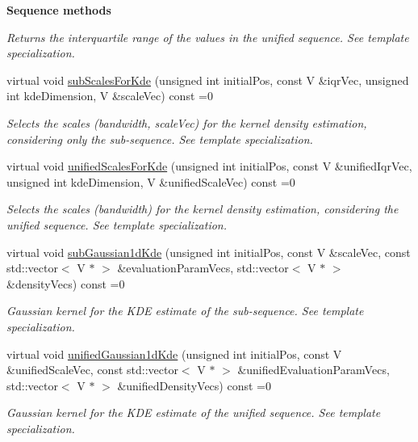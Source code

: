 \begin{Indent}{\bf Sequence methods}
\begin{DoxyCompactItemize}
\begin{DoxyCompactList}\small\item\em Returns the interquartile range of the values in the unified sequence. See template specialization. \end{DoxyCompactList}\item 
virtual void \hyperlink{class_q_u_e_s_o_1_1_base_vector_sequence_af3210c9073cedfcd8dfe79ed323975a2}{sub\-Scales\-For\-Kde} (unsigned int initial\-Pos, const V \&iqr\-Vec, unsigned int kde\-Dimension, V \&scale\-Vec) const =0
\begin{DoxyCompactList}\small\item\em Selects the scales (bandwidth, {\ttfamily scale\-Vec}) for the kernel density estimation, considering only the sub-\/sequence. See template specialization. \end{DoxyCompactList}\item 
virtual void \hyperlink{class_q_u_e_s_o_1_1_base_vector_sequence_a68eae0b37fc934391ce7af2c370fd585}{unified\-Scales\-For\-Kde} (unsigned int initial\-Pos, const V \&unified\-Iqr\-Vec, unsigned int kde\-Dimension, V \&unified\-Scale\-Vec) const =0
\begin{DoxyCompactList}\small\item\em Selects the scales (bandwidth) for the kernel density estimation, considering the unified sequence. See template specialization. \end{DoxyCompactList}\item 
virtual void \hyperlink{class_q_u_e_s_o_1_1_base_vector_sequence_a0fec2746f326acad09b406ad8efe1cfc}{sub\-Gaussian1d\-Kde} (unsigned int initial\-Pos, const V \&scale\-Vec, const std\-::vector$<$ V $\ast$ $>$ \&evaluation\-Param\-Vecs, std\-::vector$<$ V $\ast$ $>$ \&density\-Vecs) const =0
\begin{DoxyCompactList}\small\item\em Gaussian kernel for the K\-D\-E estimate of the sub-\/sequence. See template specialization. \end{DoxyCompactList}\item 
virtual void \hyperlink{class_q_u_e_s_o_1_1_base_vector_sequence_aa799ae2fde5edc96939990925d7be9ac}{unified\-Gaussian1d\-Kde} (unsigned int initial\-Pos, const V \&unified\-Scale\-Vec, const std\-::vector$<$ V $\ast$ $>$ \&unified\-Evaluation\-Param\-Vecs, std\-::vector$<$ V $\ast$ $>$ \&unified\-Density\-Vecs) const =0
\begin{DoxyCompactList}\small\item\em Gaussian kernel for the K\-D\-E estimate of the unified sequence. See template specialization. \end{DoxyCompactList}\item 

\end{DoxyCompactItemize}
\end{Indent}
